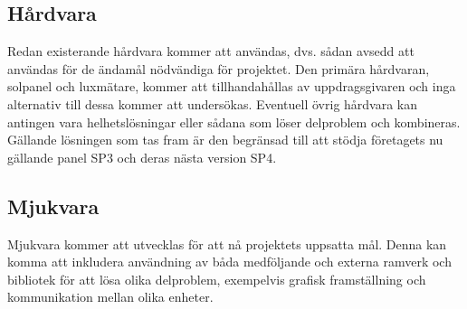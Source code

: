         \subsection{Hårdvara} %
        \label{subsec:h_rdvara}
            Redan existerande hårdvara kommer att användas, dvs. sådan avsedd att användas för de ändamål nödvändiga för projektet. 
            Den primära hårdvaran, solpanel och luxmätare, kommer att tillhandahållas av uppdragsgivaren och inga alternativ till dessa kommer att undersökas. 
            Eventuell övrig hårdvara kan antingen vara helhetslösningar eller sådana som löser delproblem och kombineras. 
            Gällande lösningen som tas fram är den begränsad till att stödja företagets nu gällande panel SP3 och deras nästa version SP4.\bigskip

        \subsection{Mjukvara} %
        \label{subsec:mjukvara}
            Mjukvara kommer att utvecklas för att nå projektets uppsatta mål. 
            Denna kan komma att inkludera användning av båda medföljande och externa ramverk och bibliotek för att lösa olika delproblem, exempelvis grafisk framställning och kommunikation mellan olika enheter.


